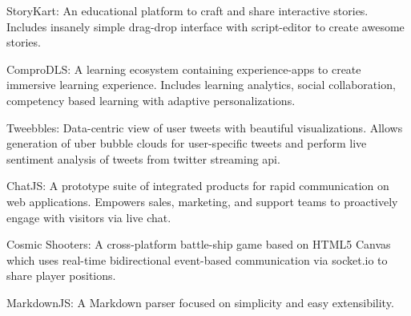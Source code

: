 

\begin{cventries}
	\cvprojects
	{
		\begin{cvitems} %
			\item {StoryKart: An educational platform to craft and share interactive stories. Includes insanely simple drag-drop interface with script-editor to create awesome stories.}
			\item {ComproDLS: A learning ecosystem containing experience-apps to create immersive learning experience. Includes learning analytics, social collaboration, competency based learning with adaptive personalizations.}
			\item {Tweebbles: Data-centric view of user tweets with beautiful visualizations. Allows generation of uber bubble clouds for user-specific tweets and perform live sentiment analysis of tweets from twitter streaming api.}
			\item {ChatJS: A prototype suite of integrated products for rapid communication on web applications. Empowers sales, marketing, and support teams to proactively engage with visitors via live chat.}
			\item {Cosmic Shooters: A cross-platform battle-ship game based on HTML5 Canvas which uses real-time bidirectional event-based communication via socket.io to share player positions.}
			\item {MarkdownJS: A Markdown parser focused on simplicity and easy extensibility.}
		\end{cvitems}	
	}

\end{cventries}

